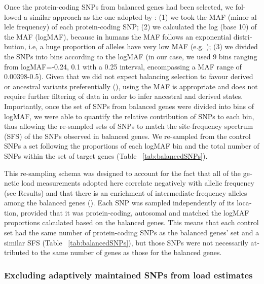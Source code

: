 \begin{refsection}
\begin{otherlanguage}{english}
Once the protein-coding SNPs from balanced genes had been selected, we followed a similar approach as the one adopted by \textcite{Subramanian2016}: (1) we took the MAF (minor allele frequency) of each protein-coding SNP; (2)  we calculated the log (base 10) of the MAF (logMAF), because in humans the MAF follows an exponential distribution, i.e, a huge proportion of alleles have very low MAF (e.g. \cite{Abecasis2012,Subramanian2016}); (3) we  divided the SNPs into bins according to the logMAF (in our case, we used 9 bins ranging from logMAF={-0.24, 0.1} with a 0.25 interval, encompassing a MAF range of 0.00398-0.5). Given that we did not expect balancing selection to favour derived or ancestral variants preferentially (\cite{Bitarello2016}), using the MAF is appropriate and does not require further filtering of data in order to infer ancestral and derived states. Importantly, once the set of SNPs from balanced genes were divided into bins of logMAF, we were able to quantify the relative contribution of SNPs to each bin, thus allowing the re-sampled sets of SNPs to match the site-frequency spectrum (SFS) of the SNPs observed in balanced genes. We re-sampled from the control SNPs a set following the proportions of each logMAF bin and the total number of SNPs within the set of target genes (Table ~\ref{tab:balancedSNPs}).

This re-sampling schema was designed to account for the fact that all of the genetic load measurements adopted here correlate negatively with allelic frequency (see Results) and that there is an enrichment of intermediate-frequency alleles among the balanced genes (\cite{Bitarello2016}). Each SNP was sampled independently of its location, provided that it was protein-coding, autosomal and matched the logMAF proportions calculated based on the balanced genes. This means that each control set  had the same number of protein-coding SNPs as the balanced genes' set and a similar SFS (Table ~\ref{tab:balancedSNPs}), but those SNPs were not necessarily attributed to the same number of genes as those for the balanced genes.


\subsubsection{Excluding adaptively maintained SNPs from load estimates}


\end{otherlanguage}
\end{refsection}
